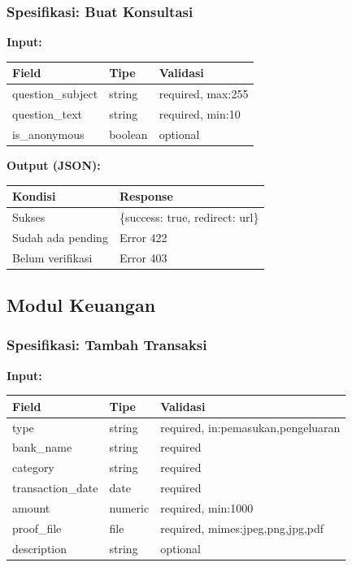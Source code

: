 \documentclass[12pt,a4paper]{article}
\begin{document}
\subsubsection{Spesifikasi: Buat Konsultasi}

\textbf{Input:}
\begin{table}[h]
\centering
\begin{tabular}{|l|l|l|}
\hline
\textbf{Field} & \textbf{Tipe} & \textbf{Validasi} \\
\hline
question\_subject & string & required, max:255 \\
question\_text & string & required, min:10 \\
is\_anonymous & boolean & optional \\
\hline
\end{tabular}
\end{table}

\textbf{Output (JSON):}
\begin{table}[h]
\centering
\begin{tabular}{|l|l|}
\hline
\textbf{Kondisi} & \textbf{Response} \\
\hline
Sukses & \{success: true, redirect: url\} \\
Sudah ada pending & Error 422 \\
Belum verifikasi & Error 403 \\
\hline
\end{tabular}
\end{table}

\subsection{Modul Keuangan}

\subsubsection{Spesifikasi: Tambah Transaksi}

\textbf{Input:}
\begin{table}[h]
\centering
\begin{tabular}{|l|l|l|}
\hline
\textbf{Field} & \textbf{Tipe} & \textbf{Validasi} \\
\hline
type & string & required, in:pemasukan,pengeluaran \\
bank\_name & string & required \\
category & string & required \\
transaction\_date & date & required \\
amount & numeric & required, min:1000 \\
proof\_file & file & required, mimes:jpeg,png,jpg,pdf \\
description & string & optional \\
\hline
\end{tabular}
\end{table}
\end{document}
